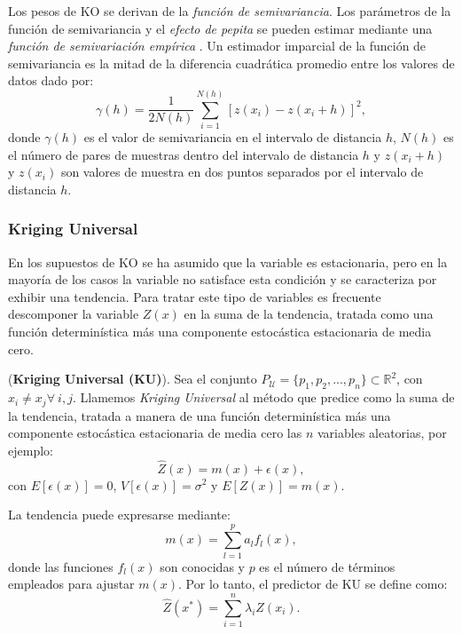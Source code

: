 Los pesos de KO se derivan de la \textit{función de semivariancia}. Los parámetros de la función de semivariancia y el \textit{efecto de pepita} se pueden estimar mediante una \textit{función de semivariación empírica} \citep{webster}. Un estimador imparcial de la función de semivariancia es la mitad de la diferencia cuadrática promedio entre los valores de datos dado por:
\begin{equation}
\gamma (h) = \frac{1}{2N(h)} \sum_{i=1}^{N(h)} [z(x_{i}) - z(x_{i} +h)]^{2}, 
\end{equation}
donde $\gamma (h)$ es el valor de semivariancia en el intervalo de distancia $h$, $N(h)$ es el número de pares de muestras dentro del intervalo de distancia $h$ y $z(x_{i} + h)$ y $z(x_{i})$ son valores de muestra en dos puntos separados por el intervalo de distancia $h$.




\subsubsection{Kriging Universal}

En los supuestos de KO se ha asumido que la variable es estacionaria, pero en la mayoría de los casos la variable no satisface esta condición y se caracteriza por exhibir una tendencia. Para tratar este tipo de variables es frecuente descomponer la variable $Z(x)$ en la suma de la tendencia, tratada como una función determinística más una componente estocástica estacionaria de media cero.

\begin{defn} (\textbf{Kriging Universal (KU)}). Sea el conjunto $P_{\mathcal{U}} = \{ p_{1}, p_{2}, ..., p_{n} \} \subset \mathbb{R}^{2}$, con $x_{i} \neq x_{j} \forall \ i, j$. Llamemos \textit{Kriging Universal} al método que predice como la suma de la tendencia, tratada a manera de una función determinística más una componente estocástica estacionaria de media cero las $n$ variables aleatorias, por ejemplo:
\begin{equation}
\hat{Z}(x) = m(x) + \epsilon(x),
\end{equation}
con $E[\epsilon(x)] = 0$, $V[\epsilon(x)] = \sigma^{2}$ y $E[Z(x)] = m(x)$.
\end{defn}

La tendencia puede expresarse mediante:
\[ m(x) = \sum_{l=1}^{p} a_{l} f_{l} (x), \]
donde las funciones $f_{l}(x)$ son conocidas y $p$ es el número de términos empleados para ajustar $m(x)$. Por lo tanto, el predictor de KU se define como:
\begin{equation}
\hat{Z} (x^{*}) = \sum_{i=1}^{n} \lambda_{i} Z(x_{i}).
\end{equation} 

 
























